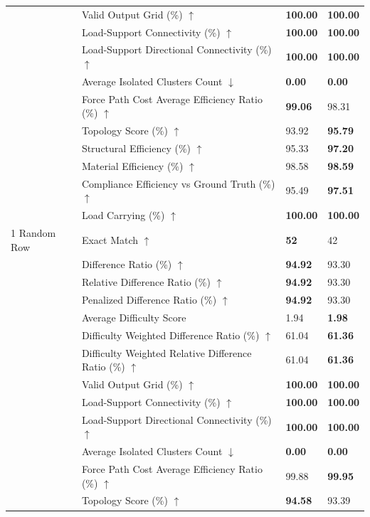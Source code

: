 \begin{table}[!h]
{\begin{tabular}{llll}
 & Valid Output Grid (\%) $\uparrow$ & \textbf{100.00} & \textbf{100.00} \\
 & Load-Support Connectivity (\%) $\uparrow$ & \textbf{100.00} & \textbf{100.00} \\
 & Load-Support Directional Connectivity (\%) $\uparrow$ & \textbf{100.00} & \textbf{100.00} \\
 & Average Isolated Clusters Count $\downarrow$ & \textbf{0.00} & \textbf{0.00} \\
 & Force Path Cost Average Efficiency Ratio (\%) $\uparrow$ & \textbf{99.06} & 98.31 \\
 & Topology Score (\%) $\uparrow$ & 93.92 & \textbf{95.79} \\
 & Structural Efficiency (\%) $\uparrow$ & 95.33 & \textbf{97.20} \\
 & Material Efficiency (\%) $\uparrow$ & 98.58 & \textbf{98.59} \\
 & Compliance Efficiency vs Ground Truth (\%) $\uparrow$ & 95.49 & \textbf{97.51} \\
 & Load Carrying (\%) $\uparrow$ & \textbf{100.00} & \textbf{100.00} \\
1 Random Row & Exact Match $\uparrow$ & \textbf{52} & 42 \\
 & Difference Ratio (\%) $\uparrow$ & \textbf{94.92} & 93.30 \\
 & Relative Difference Ratio (\%) $\uparrow$ & \textbf{94.92} & 93.30 \\
 & Penalized Difference Ratio (\%) $\uparrow$ & \textbf{94.92} & 93.30 \\
 & Average Difficulty Score & 1.94 & \textbf{1.98} \\
 & Difficulty Weighted Difference Ratio (\%) $\uparrow$ & 61.04 & \textbf{61.36} \\
 & Difficulty Weighted Relative Difference Ratio (\%) $\uparrow$ & 61.04 & \textbf{61.36} \\
 & Valid Output Grid (\%) $\uparrow$ & \textbf{100.00} & \textbf{100.00} \\
 & Load-Support Connectivity (\%) $\uparrow$ & \textbf{100.00} & \textbf{100.00} \\
 & Load-Support Directional Connectivity (\%) $\uparrow$ & \textbf{100.00} & \textbf{100.00} \\
 & Average Isolated Clusters Count $\downarrow$ & \textbf{0.00} & \textbf{0.00} \\
 & Force Path Cost Average Efficiency Ratio (\%) $\uparrow$ & 99.88 & \textbf{99.95} \\
 & Topology Score (\%) $\uparrow$ & \textbf{94.58} & 93.39 \\

\end{tabular}}
\end{table}

